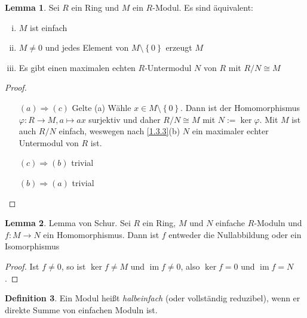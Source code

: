 \documentclass[
twoside=semi,
fontsize=12,
DIV=12, 
cleardoublepage=current,
leqno,
headings=optiontoheadandtoc, 
toc=idx
]{scrbook}
\newcommand{\set}[1]{\left\{ #1 \right\}}
\DeclareMathOperator{\im}{im}
\theoremstyle{definition}
\newtheorem{definition}{Definition}[section]
\newtheorem{lemma}[definition]{Lemma}
\begin{document}
	\begin{lemma}\label{1.3.5}
		Sei $R$ ein Ring und $M$ ein $R$-Modul. Es sind \"aquivalent:
		\begin{enumerate}[(i)]
			\item $M$ ist einfach
			\item $M \neq 0$ und jedes Element von $M \setminus \set{0}$ erzeugt $M$
			\item Es gibt einen maximalen echten $R$-Untermodul $N$ von $R$ mit $R/N \cong M$
		\end{enumerate}
	
		\begin{proof}\hfill
			\begin{enumerate}
				\item[$(a) \Rightarrow (c)$] Gelte (a) W\"ahle $x \in M \setminus \set{0}$. Dann ist der Homomorphismus $\varphi:R \to M, a \mapsto ax$ surjektiv und daher $R/N \cong M$ mit $N:=\ker \varphi$. Mit $M$ ist auch $R/N$ einfach, weswegen nach \ref{1.3.3}(b) $N$ ein maximaler echter Untermodul von $R$ ist.
				\item[$(c) \Rightarrow (b)$] trivial
				\item[$(b) \Rightarrow (a)$] trivial
			\end{enumerate}
		\end{proof}
	\end{lemma}

	\begin{lemma}\label{1.3.6}
		Lemma von Schur. \newline
		Sei $R$ ein Ring, $M$ und $N$ einfache $R$-Moduln und $f:M \to N$ ein Homomorphismus. Dann ist $f$ entweder die Nullabbildung oder ein Isomorphismus
		
		\begin{proof}
			Ist $f\neq 0$, so ist $\ker f \neq M$ und $\im f \neq 0$, also $\ker f = 0$ und $\im f = N$.
		\end{proof}
	\end{lemma}

	\begin{definition}\label{1.3.7}
		Ein Modul hei\ss t \emph{halbeinfach} (oder vollst\"andig reduzibel), wenn er direkte Summe von einfachen Moduln ist.
	\end{definition}
\end{document}
